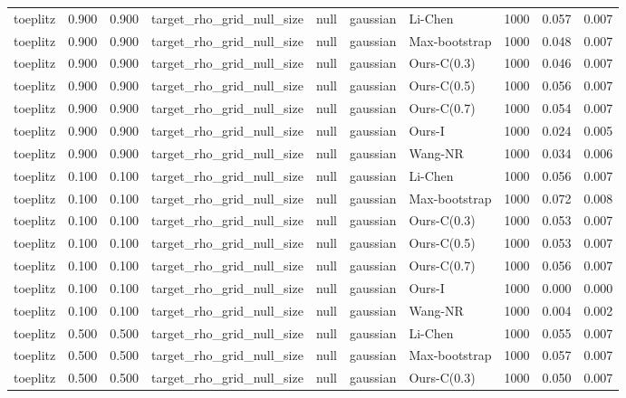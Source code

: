 \begin{tabular}{lrrllllrrr}
toeplitz & 0.900 & 0.900 & target\_rho\_grid\_null\_size & null & gaussian & Li-Chen & 1000 & 0.057 & 0.007 \\
toeplitz & 0.900 & 0.900 & target\_rho\_grid\_null\_size & null & gaussian & Max-bootstrap & 1000 & 0.048 & 0.007 \\
toeplitz & 0.900 & 0.900 & target\_rho\_grid\_null\_size & null & gaussian & Ours-C(0.3) & 1000 & 0.046 & 0.007 \\
toeplitz & 0.900 & 0.900 & target\_rho\_grid\_null\_size & null & gaussian & Ours-C(0.5) & 1000 & 0.056 & 0.007 \\
toeplitz & 0.900 & 0.900 & target\_rho\_grid\_null\_size & null & gaussian & Ours-C(0.7) & 1000 & 0.054 & 0.007 \\
toeplitz & 0.900 & 0.900 & target\_rho\_grid\_null\_size & null & gaussian & Ours-I & 1000 & 0.024 & 0.005 \\
toeplitz & 0.900 & 0.900 & target\_rho\_grid\_null\_size & null & gaussian & Wang-NR & 1000 & 0.034 & 0.006 \\
toeplitz & 0.100 & 0.100 & target\_rho\_grid\_null\_size & null & gaussian & Li-Chen & 1000 & 0.056 & 0.007 \\
toeplitz & 0.100 & 0.100 & target\_rho\_grid\_null\_size & null & gaussian & Max-bootstrap & 1000 & 0.072 & 0.008 \\
toeplitz & 0.100 & 0.100 & target\_rho\_grid\_null\_size & null & gaussian & Ours-C(0.3) & 1000 & 0.053 & 0.007 \\
toeplitz & 0.100 & 0.100 & target\_rho\_grid\_null\_size & null & gaussian & Ours-C(0.5) & 1000 & 0.053 & 0.007 \\
toeplitz & 0.100 & 0.100 & target\_rho\_grid\_null\_size & null & gaussian & Ours-C(0.7) & 1000 & 0.056 & 0.007 \\
toeplitz & 0.100 & 0.100 & target\_rho\_grid\_null\_size & null & gaussian & Ours-I & 1000 & 0.000 & 0.000 \\
toeplitz & 0.100 & 0.100 & target\_rho\_grid\_null\_size & null & gaussian & Wang-NR & 1000 & 0.004 & 0.002 \\
toeplitz & 0.500 & 0.500 & target\_rho\_grid\_null\_size & null & gaussian & Li-Chen & 1000 & 0.055 & 0.007 \\
toeplitz & 0.500 & 0.500 & target\_rho\_grid\_null\_size & null & gaussian & Max-bootstrap & 1000 & 0.057 & 0.007 \\
toeplitz & 0.500 & 0.500 & target\_rho\_grid\_null\_size & null & gaussian & Ours-C(0.3) & 1000 & 0.050 & 0.007 \\

\end{tabular}
